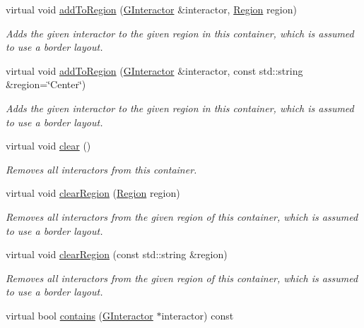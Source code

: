 \begin{DoxyCompactItemize}
virtual void \mbox{\hyperlink{classGContainer_ad05df0d92ab2fba95d401a5614365558}{add\+To\+Region}} (\mbox{\hyperlink{classGInteractor}{G\+Interactor}} \&interactor, \mbox{\hyperlink{classGContainer_a81a01a86de31071a92e6cce0bab9bc4b}{Region}} region)
\begin{DoxyCompactList}\small\item\em Adds the given interactor to the given region in this container, which is assumed to use a border layout. \end{DoxyCompactList}\item 
virtual void \mbox{\hyperlink{classGContainer_a667ed0065e0bbb52a893904e7f2383bb}{add\+To\+Region}} (\mbox{\hyperlink{classGInteractor}{G\+Interactor}} \&interactor, const std\+::string \&region=\char`\"{}Center\char`\"{})
\begin{DoxyCompactList}\small\item\em Adds the given interactor to the given region in this container, which is assumed to use a border layout. \end{DoxyCompactList}\item 
virtual void \mbox{\hyperlink{classGContainer_ac8bb3912a3ce86b15842e79d0b421204}{clear}} ()
\begin{DoxyCompactList}\small\item\em Removes all interactors from this container. \end{DoxyCompactList}\item 
virtual void \mbox{\hyperlink{classGContainer_a47f0cc45498a78757fa4d0e6befc2981}{clear\+Region}} (\mbox{\hyperlink{classGContainer_a81a01a86de31071a92e6cce0bab9bc4b}{Region}} region)
\begin{DoxyCompactList}\small\item\em Removes all interactors from the given region of this container, which is assumed to use a border layout. \end{DoxyCompactList}\item 
virtual void \mbox{\hyperlink{classGContainer_aeba526cb4d6d6f3d8d6f376656af8dc8}{clear\+Region}} (const std\+::string \&region)
\begin{DoxyCompactList}\small\item\em Removes all interactors from the given region of this container, which is assumed to use a border layout. \end{DoxyCompactList}\item 
virtual bool \mbox{\hyperlink{classGContainer_a29e67f98cd36414c67475b8941d861a6}{contains}} (\mbox{\hyperlink{classGInteractor}{G\+Interactor}} $\ast$interactor) const

\end{DoxyCompactItemize}
